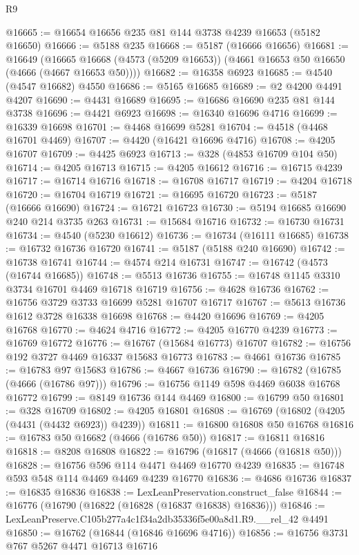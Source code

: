 \begin{lexlean}{R9}
\begin{coremodule}
@16665 := @16654 @16656 @235 @81 @144 @3738 @4239 @16653 (@5182 @16650)
@16666 := @5188 @235
@16668 := @5187 (@16666 @16656)
@16681 := @16649
    (@16665 @16668 (@4573 (@5209 @16653)) (@4661 @16653 @50 @16650 (@4666 (@4667 @16653 @50))))
@16682 := @16358 @6923
@16685 := @4540 (@4547 @16682) @4550
@16686 := @5165 @16685
@16689 := @2 @4200 @4491 @4207
@16690 := @4431 @16689
@16695 := @16686 @16690 @235 @81 @144 @3738
@16696 := @4421 @6923
@16698 := @16340 @16696 @4716
@16699 := @16339 @16698
@16701 := @4468 @16699 @5281
@16704 := @4518 (@4468 @16701 @4469)
@16707 := @4420 (@16421 @16696 @4716)
@16708 := @4205 @16707
@16709 := @4425 @6923
@16713 := @328 (@4853 @16709 @104 @50)
@16714 := @4205 @16713
@16715 := @4205 @16612
@16716 := @16715 @4239
@16717 := @16714 @16716
@16718 := @16708 @16717
@16719 := @4204 @16718
@16720 := @16704 @16719
@16721 := @16695 @16720
@16723 := @5187 (@16666 @16690)
@16724 := @16721 @16723
@16730 := @5194 @16685 @16690 @240 @214 @3735 @263
@16731 := @15684 @16716
@16732 := @16730 @16731
@16734 := @4540 (@5230 @16612)
@16736 := @16734 (@16111 @16685)
@16738 := @16732 @16736 @16720
@16741 := @5187 (@5188 @240 @16690)
@16742 := @16738 @16741
@16744 := @4574 @214 @16731
@16747 := @16742 (@4573 (@16744 @16685))
@16748 := @5513 @16736
@16755 := @16748 @1145 @3310 @3734 @16701 @4469 @16718 @16719
@16756 := @4628 @16736
@16762 := @16756 @3729 @3733 @16699 @5281 @16707 @16717
@16767 := @5613 @16736 @1612 @3728 @16338 @16698
@16768 := @4420 @16696
@16769 := @4205 @16768
@16770 := @4624 @4716
@16772 := @4205 @16770 @4239
@16773 := @16769 @16772
@16776 := @16767 (@15684 @16773) @16707
@16782 := @16756 @192 @3727 @4469 @16337 @15683 @16773
@16783 := @4661 @16736
@16785 := @16783 @97 @15683
@16786 := @4667 @16736
@16790 := @16782 (@16785 (@4666 (@16786 @97)))
@16796 := @16756 @1149 @598 @4469 @6038 @16768 @16772
@16799 := @8149 @16736 @144 @4469
@16800 := @16799 @50
@16801 := @328 @16709
@16802 := @4205 @16801
@16808 := @16769 (@16802 (@4205 (@4431 (@4432 @6923)) @4239))
@16811 := @16800 @16808 @50 @16768
@16816 := @16783 @50 @16682 (@4666 (@16786 @50))
@16817 := @16811 @16816
@16818 := @8208 @16808
@16822 := @16796 (@16817 (@4666 (@16818 @50)))
@16828 := @16756 @596 @114 @4471 @4469 @16770 @4239
@16835 := @16748 @593 @548 @114 @4469 @4469 @4239 @16770
@16836 := @4686 @16736
@16837 := @16835 @16836
@16838 := LexLeanPreservation.construct_false
@16844 := @16776 (@16790 (@16822 (@16828 (@16837 @16838) @16836)))
@16846 := LexLeanPreserve.C105b277a4c1f34a2db35336f5e00a8d1.R9.__rel_42 @4491
@16850 := @16762 (@16844 (@16846 @16696 @4716))
@16856 := @16756 @3731 @767 @5267 @4471 @16713 @16716

\end{coremodule}
\end{lexlean}
